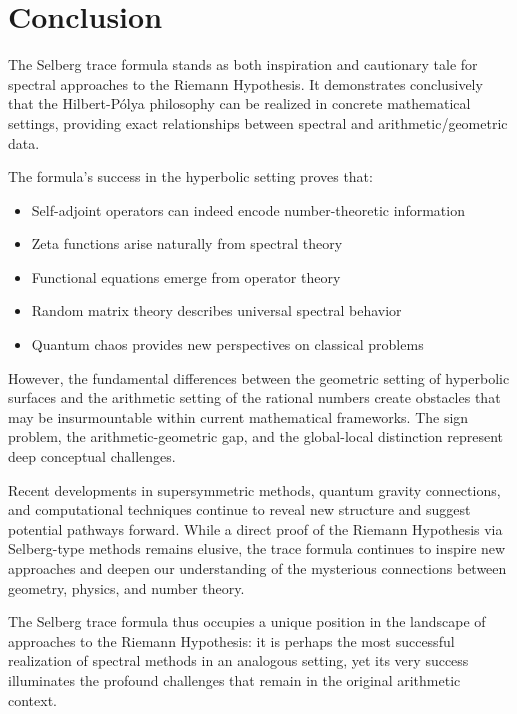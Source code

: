 \section{Conclusion}
\label{sec:conclusion}

The Selberg trace formula stands as both inspiration and cautionary tale for spectral approaches to the Riemann Hypothesis. It demonstrates conclusively that the Hilbert-Pólya philosophy can be realized in concrete mathematical settings, providing exact relationships between spectral and arithmetic/geometric data.

The formula's success in the hyperbolic setting proves that:
\begin{itemize}
\item Self-adjoint operators can indeed encode number-theoretic information
\item Zeta functions arise naturally from spectral theory
\item Functional equations emerge from operator theory
\item Random matrix theory describes universal spectral behavior
\item Quantum chaos provides new perspectives on classical problems
\end{itemize}

However, the fundamental differences between the geometric setting of hyperbolic surfaces and the arithmetic setting of the rational numbers create obstacles that may be insurmountable within current mathematical frameworks. The sign problem, the arithmetic-geometric gap, and the global-local distinction represent deep conceptual challenges.

Recent developments in supersymmetric methods, quantum gravity connections, and computational techniques continue to reveal new structure and suggest potential pathways forward. While a direct proof of the Riemann Hypothesis via Selberg-type methods remains elusive, the trace formula continues to inspire new approaches and deepen our understanding of the mysterious connections between geometry, physics, and number theory.

The Selberg trace formula thus occupies a unique position in the landscape of approaches to the Riemann Hypothesis: it is perhaps the most successful realization of spectral methods in an analogous setting, yet its very success illuminates the profound challenges that remain in the original arithmetic context.